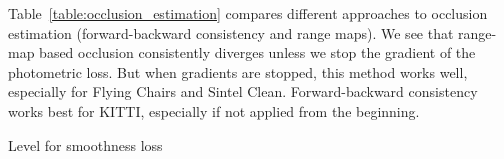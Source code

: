 \documentclass[runningheads]{llncs}
\begin{document}
 Table~\ref{table:occlusion_estimation} compares different approaches to occlusion estimation (forward-backward consistency and range maps). We see that range-map based occlusion consistently diverges unless we stop the gradient of the photometric loss. But when gradients are stopped, this method works well, especially for Flying Chairs and Sintel Clean. Forward-backward consistency works best for KITTI, especially if not applied from the beginning.

\pagebreak

\begin{wraptable}{r}{0.45\columnwidth}
    \vspace{-10.5pt}
    \caption{Level for smoothness loss}
    \label{table:smoothness_level}
    \caption{Comparison of weights for first/second order smoothness}
    \label{table:smoothness_weights}
\end{wraptable}
\end{document}

